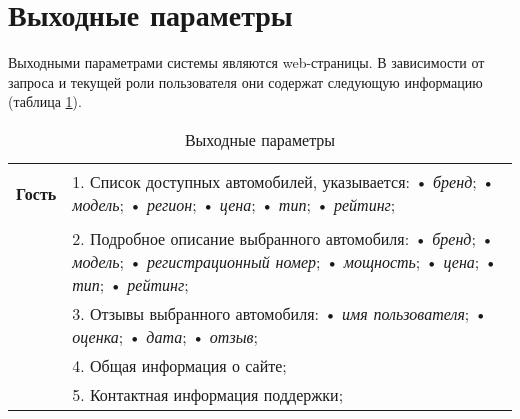 \section{Выходные параметры}
Выходными параметрами системы являются web-страницы. В зависимости от запроса и текущей роли пользователя они содержат следующую информацию (таблица \ref{tbl:output-data}).

\begin{longtable}{|p{0.5cm}|p{15.5cm}|}
	\caption{Выходные параметры}
	\label{tbl:output-data} \\
	\hline
	
	\begin{rotatebox}[origin=r]{90}
		{ \textbf{Гость}}
	\end{rotatebox} 
	& 
	1. Список доступных автомобилей, указывается: \newline
	• \textit{бренд}; \newline
	• \textit{модель}; \newline
	• \textit{регион}; \newline
	• \textit{цена}; \newline
	• \textit{тип}; \newline
	• \textit{рейтинг}; \\
	\cline{2-2}
	
	&
	2. Подробное описание выбранного автомобиля: \newline
	• \textit{бренд}; \newline
	• \textit{модель}; \newline
	• \textit{регистрационный номер}; \newline
	• \textit{мощность}; \newline
	• \textit{цена}; \newline
	• \textit{тип}; \newline
	• \textit{рейтинг}; \\
	\cline{2-2}
	
	&
	3. Отзывы выбранного автомобиля: \newline
	• \textit{имя пользователя}; \newline
	• \textit{оценка}; \newline
	• \textit{дата}; \newline
	• \textit{отзыв}; \\
	\cline{2-2}
	
	&
	4. Общая информация о сайте; \\
	\cline{2-2}
	
	&
	5. Контактная информация поддержки;
	\\
	\hline
	

\end{longtable}
